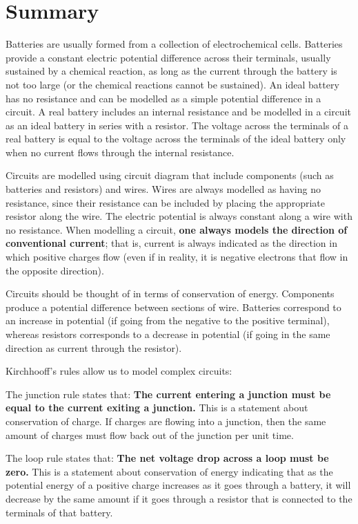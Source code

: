 \section{Summary}
\vspace{-0.25cm}
\begin{chapterSummary}
Batteries are usually formed from a collection of electrochemical cells. Batteries provide a constant electric potential difference across their terminals, usually sustained by a chemical reaction, as long as the current through the battery is not too large (or the chemical reactions cannot be sustained). An ideal battery has no resistance and can be modelled as a simple potential difference in a circuit. A real battery includes an internal resistance and be modelled in a circuit as an ideal battery in series with a resistor. The voltage across the terminals of a real battery is equal to the voltage across the terminals of the ideal battery only when no current flows through the internal resistance. 

Circuits are modelled using circuit diagram that include components (such as batteries and resistors) and wires. Wires are always modelled as having no resistance, since their resistance can be included by placing the appropriate resistor along the wire. The electric potential is always constant along a wire with no resistance. When modelling a circuit, \textbf{one always models the direction of conventional current}; that is, current is always indicated as the direction in which positive charges flow (even if in reality, it is negative electrons that flow in the opposite direction).

Circuits should be thought of in terms of conservation of energy. Components produce a potential difference between sections of wire. Batteries correspond to an increase in potential (if going from the negative to the positive terminal), whereas resistors corresponds to a decrease in potential (if going in the same direction as current through the resistor). 

Kirchhooff's rules allow us to model complex circuits:
 
The junction rule states that: \textbf{The current entering a junction must be equal to the current exiting a junction.} This is a statement about conservation of charge. If charges are flowing into a junction, then the same amount of charges must flow back out of the junction per unit time.

The loop rule states that: \textbf{The net voltage drop across a loop must be zero.} This is a statement about conservation of energy indicating that as the potential energy of a positive charge increases as it goes through a battery, it will decrease by the same amount if it goes through a resistor that is connected to the terminals of that battery.


\end{chapterSummary}
